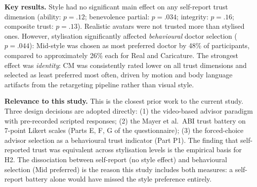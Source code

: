 \documentclass[11pt, a4paper]{article}
\begin{document}
\textbf{Key results.} Style had no significant main effect on any self-report trust dimension (ability: $p = .12$; benevolence partial: $p = .034$; integrity: $p = .16$; composite trust: $p = .13$). Realistic avatars were not trusted more than stylised ones. However, stylisation significantly affected \textit{behavioural} doctor selection ($p = .044$): Mid-style was chosen as most preferred doctor by 48\% of participants, compared to approximately 26\% each for Real and Caricature. The strongest effect was \textit{identity}: CM was consistently rated lower on all trust dimensions and selected as least preferred most often, driven by motion and body language artifacts from the retargeting pipeline rather than visual style.

\textbf{Relevance to this study.} This is the closest prior work to the current study. Three design decisions are adopted directly: (1) the video-based advisor paradigm with pre-recorded scripted responses; (2) the Mayer et al.\ ABI trust battery on 7-point Likert scales (Parts E, F, G of the questionnaire); (3) the forced-choice advisor selection as a behavioural trust indicator (Part P1). The finding that self-reported trust was equivalent across stylisation levels is the empirical basis for H2. The dissociation between self-report (no style effect) and behavioural selection (Mid preferred) is the reason this study includes both measures: a self-report battery alone would have missed the style preference entirely.
\end{document}
